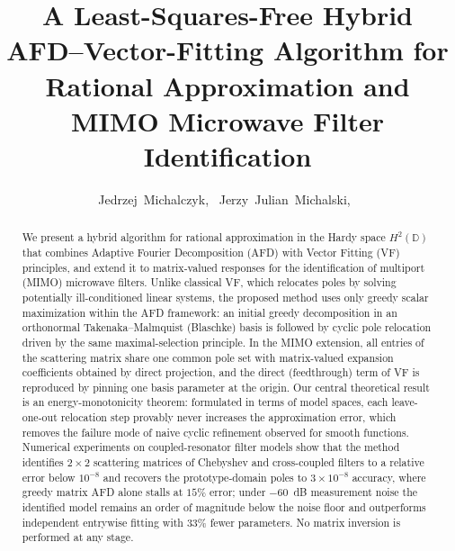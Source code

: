 \documentclass[journal]{IEEEtran}%
\begin{document}
\raggedbottom
%
%
%
\title{A Least-Squares-Free Hybrid AFD--Vector-Fitting Algorithm for Rational Approximation and MIMO Microwave Filter Identification}
%
\author{Jedrzej~Michalczyk,~
        Jerzy~Julian~Michalski,~
}


\maketitle

\begin{abstract}
We present a hybrid algorithm for rational approximation in the Hardy space $H^2(\mathbb{D})$ that combines Adaptive Fourier Decomposition (AFD) with Vector Fitting (VF) principles, and extend it to matrix-valued responses for the identification of multiport (MIMO) microwave filters. Unlike classical VF, which relocates poles by solving potentially ill-conditioned linear systems, the proposed method uses only greedy scalar maximization within the AFD framework: an initial greedy decomposition in an orthonormal Takenaka--Malmquist (Blaschke) basis is followed by cyclic pole relocation driven by the same maximal-selection principle. In the MIMO extension, all entries of the scattering matrix share one common pole set with matrix-valued expansion coefficients obtained by direct projection, and the direct (feedthrough) term of VF is reproduced by pinning one basis parameter at the origin. Our central theoretical result is an energy-monotonicity theorem: formulated in terms of model spaces, each leave-one-out relocation step provably never increases the approximation error, which removes the failure mode of naive cyclic refinement observed for smooth functions. Numerical experiments on coupled-resonator filter models show that the method identifies $2\times 2$ scattering matrices of Chebyshev and cross-coupled filters to a relative error below $10^{-8}$ and recovers the prototype-domain poles to $3\times 10^{-8}$ accuracy, where greedy matrix AFD alone stalls at $15\%$ error; under $-60$~dB measurement noise the identified model remains an order of magnitude below the noise floor and outperforms independent entrywise fitting with $33\%$ fewer parameters. No matrix inversion is performed at any stage.
\end{abstract}
\end{document}
